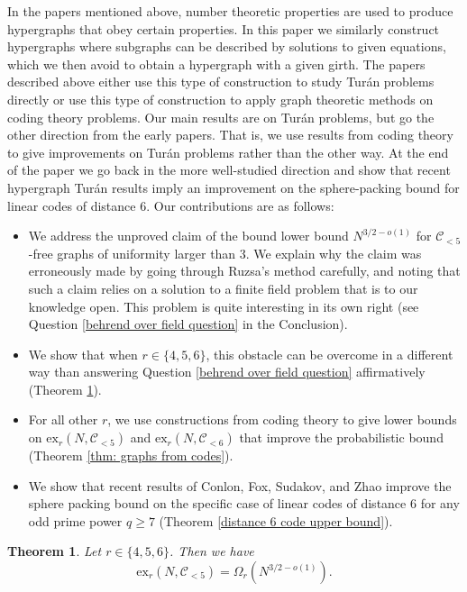 \documentclass[12pt]{article}%
\newtheorem{theorem}{Theorem}[section]
\begin{document}
In the papers mentioned above, number theoretic properties are used to produce hypergraphs that obey certain properties. In this paper we similarly construct hypergraphs where subgraphs can be described by solutions to given equations, which we then avoid to obtain a hypergraph with a given girth. The papers described above either use this type of construction to study Tur\'an problems directly or use this type of construction to apply graph theoretic methods on coding theory problems. Our main results are on Tur\'an problems, but go the other direction from the early papers. That is, we use results from coding theory to give improvements on Tur\'an problems rather than the other way. At the end of the paper we go back in the more well-studied direction and show that recent hypergraph Tur\'an results imply an improvement on the sphere-packing bound for linear codes of distance $6$. Our contributions are as follows:

\begin{itemize}
\item We address the unproved claim 
of the bound lower bound $N^{3/2-o(1)}$ for $\mathcal{C}_{<5}$-free graphs of uniformity larger than 3.  We explain why the claim was erroneously made by going through Ruzsa's method carefully, and noting that such a claim relies on a solution to a finite field problem that is to our knowledge open. This problem is quite interesting in its own right (see Question \ref{behrend over field question} in the Conclusion).
\item We show that when $r \in \{4,5,6 \}$, this obstacle can be overcome in a different way than answering Question \ref{behrend over field question} affirmatively (Theorem \ref{thm: 456}).    
\item For all other $r$, we use constructions from coding theory to give lower bounds on $\mathrm{ex}_r(N, \mathcal{C}_{<5})$ and $\mathrm{ex}_r(N, \mathcal{C}_{<6})$ that improve the probabilistic bound (Theorem \ref{thm: graphs from codes}).
\item We show that recent results of Conlon, Fox, Sudakov, and Zhao \cite{conlon} improve the sphere packing bound on the specific case of linear codes of distance $6$ for any odd prime power $q\geq 7$ (Theorem \ref{distance 6 code upper bound}). 
\end{itemize}


\begin{theorem}\label{thm: 456}
    Let $r\in \{4,5,6\}$. Then we have 
    \[
    \mathrm{ex}_r(N, \mathcal{C}_{<5})  = \Omega_r\left(N^{3/2-o(1)}\right).
    \]
\end{theorem}
\end{document}
